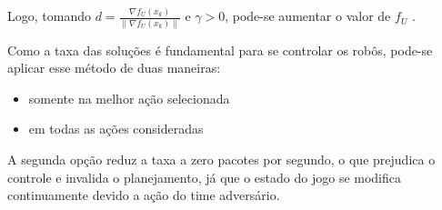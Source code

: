 Logo, tomando $d = \frac{\nabla f_U(x_k)}{\lVert \nabla f_U(x_k)\rVert}$ e
$\gamma > 0$, pode-se aumentar o valor de $f_U$ \cite{belegundu2011optimization}.

Como a taxa das soluções é fundamental para se controlar os robôs, pode-se
aplicar esse método de duas maneiras:
\begin{itemize}
  \item somente na melhor ação selecionada
  \item em todas as ações consideradas
\end{itemize}

A segunda opção reduz a taxa a zero pacotes por segundo, o que
prejudica o controle e invalida o planejamento, já que o estado
do jogo se modifica continuamente devido a ação do time adversário.





